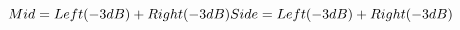 \begin{equation}
Mid = Left(-3dB) + Right(-3dB)\\Side = Left(-3dB) + Right(-3dB)
\label{eq:mid}
\end{equation}


\vfill\null

\raggedright
%



